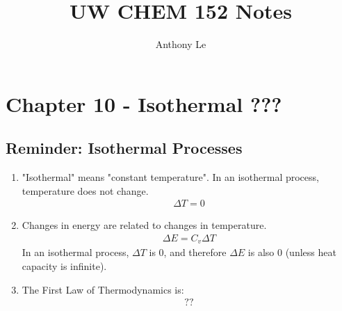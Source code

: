 \documentclass{article}  %
\title{UW CHEM 152 Notes}
\author{Anthony Le}
\begin{document}
\pagestyle{fancy}
\fancyhead{}



\newpage



\newpage



\newpage



\newpage 

\section*{Chapter 10 - Isothermal ???}
\subsection*{Reminder: Isothermal Processes}
\begin{enumerate}
    \item "Isothermal" means "constant temperature". In an isothermal process, temperature does not change.
        \begin{equation*}
            \begin{aligned}
                \Delta T = 0
            \end{aligned}
        \end{equation*}
    \item Changes in energy are related to changes in temperature.
        \begin{equation*}
            \begin{aligned}
                \Delta E = C_v \Delta T
            \end{aligned}
        \end{equation*}
    In an isothermal process, $\Delta T$ is 0, and therefore $\Delta E$ is also 0 (unless heat capacity is infinite).
    \item The First Law of Thermodynamics is:
        \begin{equation*}
            \begin{aligned}
                ?? %
            \end{aligned}
        \end{equation*}
\end{enumerate}
\end{document}

